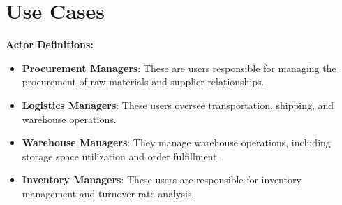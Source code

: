 \section{Use Cases}
\textbf{Actor Definitions:}
\begin{itemize}
	\item \textbf{Procurement Managers}: These are users responsible for managing the procurement of raw materials and supplier relationships.
	\item \textbf{Logistics Managers}: These users oversee transportation, shipping, and warehouse operations.
	\item \textbf{Warehouse Managers}: They manage warehouse operations, including storage space utilization and order fulfillment.
	\item \textbf{Inventory Managers}: These users are responsible for inventory management and turnover rate analysis.
\end{itemize}

